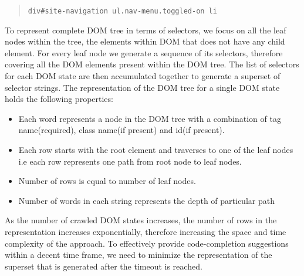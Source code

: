		\begin{quote}
			\texttt{div\#site-navigation ul.nav-menu.toggled-on li}
		\end{quote}
			
		To represent complete DOM tree in terms of \css selectors, we focus on all the leaf nodes within the tree, \ie the elements within DOM that does not have any child element. For every leaf node we generate a sequence of its \css selectors, therefore covering all the DOM elements present within the DOM tree. The list of \css selectors for each DOM state are then accumulated together to generate a superset of \css selector strings. The \css representation of the DOM tree for a single DOM state holds the following properties:
		\begin{itemize}
			 \item Each word represents a node in the DOM tree with a combination of tag name(required), class name(if present) and id(if present).
			 \item Each row starts with the root element and traverses to one of the leaf nodes i.e each row represents one path from root node to leaf nodes.
			\item Number of rows is equal to number of leaf nodes.
			 \item Number of words in each string represents the depth of particular path
		\end{itemize}
		
		As the number of crawled DOM states increases, the number of rows in the \css representation increases exponentially, therefore increasing the space and time complexity of the approach. To effectively provide code-completion suggestions within a decent time frame, we need to minimize the \css representation of the superset that is generated after the timeout is reached.
		
